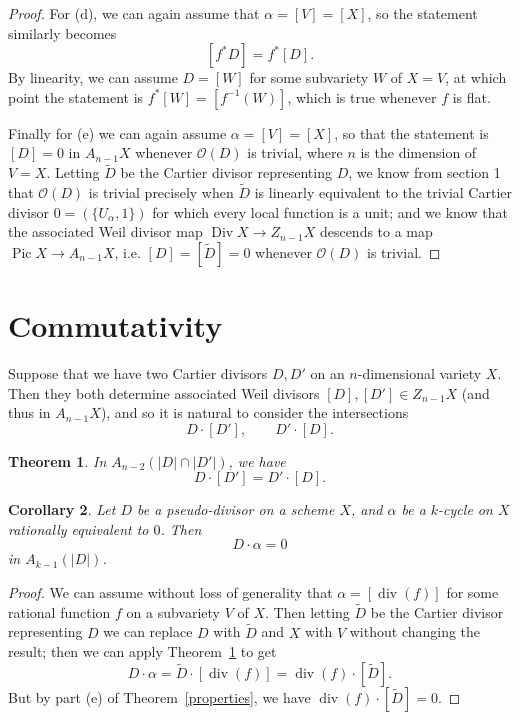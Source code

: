 \documentclass[leqno, openany]{memoir}
\newtheorem{thm}{Theorem}[section]
\newtheorem{cor}[thm]{Corollary}
\theoremstyle{definition}
\theoremstyle{remark}
\theoremstyle{plain}
\theoremstyle{definition}
\theoremstyle{remark}
\newcommand{\mc}[1]{\mathcal{#1}}
\renewcommand{\div}{\operatorname{div}}
\DeclareMathOperator{\Pic}{Pic}
\DeclareMathOperator{\Div}{Div}
\begin{document}
\begin{proof}
For (d), we can again assume that $\alpha = [V] = [X]$, so the statement
similarly becomes \[ [f^* D] = f^* [D] . \] By linearity, we can assume $D =
[W]$ for some subvariety $W$ of $X = V$, at which point the statement is $f^*
[W] = [f^{-1}(W)]$, which is true whenever $f$ is flat.

Finally for (e) we can again assume $\alpha = [V] = [X]$, so that the statement
is $[D] = 0$ in $A_{n-1} X$ whenever $\mc{O}(D)$ is trivial, where $n$ is the
dimension of $V = X$. Letting $\tilde D$ be the Cartier divisor representing
$D$, we know from section 1 that $\mc{O}(D)$ is trivial precisely when $\tilde
D$ is linearly equivalent to the trivial Cartier divisor $0 = (\{U_\alpha,
1\})$ for which every local function is a unit; and we know that the associated
Weil divisor map $\Div X \to Z_{n-1} X$ descends to a map $\Pic X \to A_{n-1}
X$, i.e. $[D] = [\tilde D] = 0$ whenever $\mc{O}(D)$ is trivial.  \end{proof}

\section{Commutativity} Suppose that we have two Cartier divisors $D, D'$ on an
$n$-dimensional variety $X$. Then they both determine associated Weil divisors
$[D], [D'] \in Z_{n-1} X$ (and thus in $A_{n-1} X$), and so it is natural to
consider the intersections \[ D \cdot [D'], \qquad D' \cdot [D] . \]

\begin{thm} \label{commutativity} In $A_{n-2}(|D| \cap |D'|)$, we have \[ D
\cdot [D'] = D' \cdot [D] . \] \end{thm}

\begin{cor} \label{preserving} Let $D$ be a pseudo-divisor on a scheme $X$, and
    $\alpha$ be a $k$-cycle on $X$ rationally equivalent to $0$. Then \[ D
        \cdot \alpha = 0 \] in $A_{k-1} (|D|)$.  \end{cor} \begin{proof} We can
        assume without loss of generality that $\alpha = [\div (f)]$ for some
        rational function $f$ on a subvariety $V$ of $X$. Then letting $\tilde
        D$ be the Cartier divisor representing $D$ we can replace $D$ with
        $\tilde D$ and $X$ with $V$ without changing the result; then we can
        apply Theorem~\ref{commutativity} to get \[ D \cdot \alpha = \tilde D
        \cdot [\div (f)] = \div (f) \cdot [\tilde D]. \] But by part (e) of
        Theorem~\ref{properties}, we have $\div (f) \cdot [\tilde D] = 0$.
    \end{proof}
\end{document}
